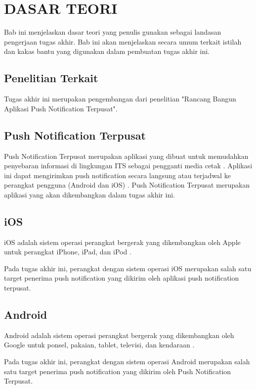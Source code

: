 \chapter{DASAR TEORI}
\par Bab ini menjelaskan dasar teori yang penulis gunakan sebagai landasan pengerjaan tugas akhir. Bab ini akan menjelaskan secara umum terkait istilah dan kakas bantu yang digunakan dalam pembuatan tugas akhir ini.

\section{Penelitian Terkait}
\par Tugas akhir ini merupakan pengembangan dari penelitian "Rancang Bangun Aplikasi Push Notification Terpusat".

\section{Push Notification Terpusat}
\par Push Notification Terpusat merupakan aplikasi yang dibuat untuk memudahkan penyebaran informasi di lingkungan ITS sebagai pengganti media cetak \cite{application-thesis}. Aplikasi ini dapat mengirimkan push notification secara langsung atau terjadwal ke perangkat pengguna (Android dan iOS) \cite{application-thesis}. Push Notification Terpusat merupakan aplikasi yang akan dikembangkan dalam tugas akhir ini.

\section{iOS}
\par iOS adalah sistem operasi perangkat bergerak yang dikembangkan oleh Apple untuk perangkat iPhone, iPad, dan iPod \cite{ios-online}.
\par Pada tugas akhir ini, perangkat dengan sistem operasi iOS merupakan salah satu target penerima push notification yang dikirim oleh aplikasi push notification terpusat.

\section{Android}
\par Android adalah sistem operasi perangkat bergerak yang dikembangkan oleh Google untuk ponsel, pakaian, tablet, televisi, dan kendaraan \cite{android-online}.
\par Pada tugas akhir ini, perangkat dengan sistem operasi Android merupakan salah satu target penerima push notification yang dikirim oleh Push Notification Terpusat.

